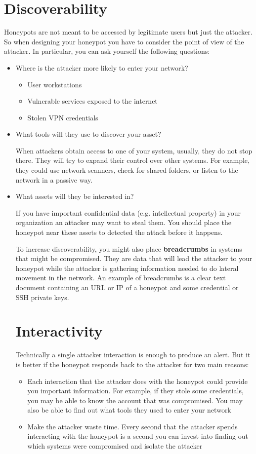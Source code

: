 \documentclass[epsfig,a4paper,11pt,titlepage,oneside,openany]{book}
\begin{document}
\section{Discoverability}
Honeypots are not meant to be accessed by legitimate users but just the attacker. So when designing your honeypot you have to consider the point of view of the attacker.
In particular, you can ask yourself the following questions:
\begin{itemize}
\item Where is the attacker more likely to enter your network?
	\begin{itemize}
	\item User workstations
	\item Vulnerable services exposed to the internet
	\item Stolen VPN credentials
	\end{itemize}
\item What tools will they use to discover your asset?

When attackers obtain access to one of your system, usually, they do not stop there. They will try to expand their control over other systems. For example, they could use network scanners, check for shared folders, or listen to the network in a passive way.
\item What assets will they be interested in?

If you have important confidential data (e.g. intellectual property) in your organization an attacker may want to steal them. You should place the honeypot near these assets to detected the attack before it happens.

To increase discoverability, you might also place \textbf{breadcrumbs} in systems that might be compromised. They are data that will lead the attacker to your honeypot while the attacker is gathering information needed to do lateral movement in the network. An example of breadcrumbs is a clear text document containing an URL or IP of a honeypot and some credential or SSH private keys.

\section{Interactivity}

Technically a single attacker interaction is enough to produce an alert. But it is better if the honeypot responds back to the attacker for two main reasons:
\begin{itemize}
\item Each interaction that the attacker does with the honeypot could provide you important information. For example, if they stole some credentials, you may be able to know the account that was compromised. You may also be able to find out what tools they used to enter  your network
\item Make the attacker waste time. Every second that the attacker spends interacting with the honeypot is a second you can invest into finding out which systems were compromised and isolate the attacker
\end{itemize}




\end{itemize}
\end{document}
